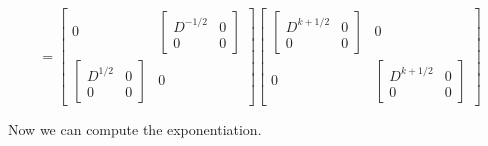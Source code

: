 \begin{dmath}
=
\begin{bmatrix} %
0 &
\begin{bmatrix}
D^{-1/2} & 0 \\
0 & 0
\end{bmatrix} \\
\begin{bmatrix}
D^{1/2} & 0 \\
0 & 0
\end{bmatrix} &
0 
\end{bmatrix} %
\begin{bmatrix}
\begin{bmatrix}
D^{k+1/2} & 0 \\
0 & 0
\end{bmatrix} 
& 0 \\
0 &
\begin{bmatrix}
D^{k + 1/2} & 0 \\
0 & 0
\end{bmatrix}
\end{bmatrix}
\end{dmath}

Now we can compute the exponentiation.

